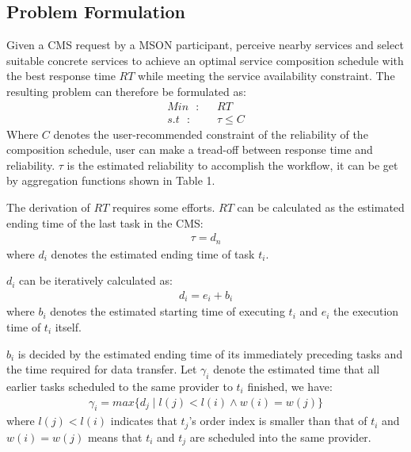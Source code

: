 \documentclass[journal]{IEEEtran}
\begin{document}
\subsection{Problem Formulation}
Given a CMS request by a MSON participant, perceive nearby services and select suitable concrete services to achieve an optimal service composition schedule with the best response time $RT$ while meeting the service availability constraint. The resulting problem can therefore be formulated as:
\begin{align}
Min  \ \ \  : \ \ \ & RT   \\\nonumber
s.t \ \ \ : \ \ \ & \tau \le C
\end{align}
Where $C$ denotes the user-recommended constraint of the reliability of the composition schedule, user can make a tread-off between response time and reliability. $\tau$ is the estimated reliability to accomplish the workflow, it can be get by aggregation functions shown in Table 1.

The derivation of $RT$ requires some efforts. $RT$ can be calculated as the estimated ending time of the last task in the CMS:
\begin{align}
\tau = d_n
\end{align}
where $d_i$ denotes the estimated ending time of task $t_i$.

$d_i$ can be iteratively calculated as:
\begin{align}
d_i = e_i + b_i
\end{align}
where $b_i$ denotes the estimated starting time of executing $t_i$ and $e_i$ the execution time of $t_i$ itself.

$b_i$ is decided by the estimated ending time of its immediately preceding tasks and the time required for data transfer. Let $\gamma_i$ denote the estimated time that all earlier tasks scheduled to the same provider to $t_i$ finished, we have:
\begin{align}
\gamma_i =  max\{d_j \mid l(j) < l(i) \wedge w(i) = w(j) \}
\end{align}
where $l(j) < l(i)$ indicates that $t_j$’s order index is smaller than that of $t_i$ and $w(i) = w(j)$ means that $t_i$ and $t_j$ are scheduled into the same provider.
\end{document}
